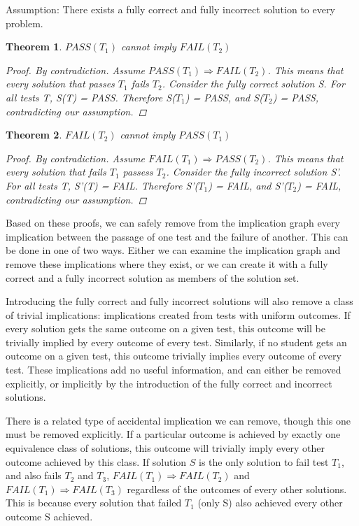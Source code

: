 \documentclass[11pt,twoside]{article}
\newcommand\fail{\mathit{FAIL}}
\newcommand\pass{\mathit{PASS}}
\newtheorem{thm}{Theorem}
\theoremstyle{definition}
\begin{document}
Assumption: There exists a fully correct and fully incorrect solution to every problem.


\begin{thm} $\pass(T_1)$ cannot imply $\fail(T_2)$

\begin{proof} By contradiction. Assume $\pass(T_1) \Rightarrow \fail(T_2)$. This means that every solution that passes $T_1$ fails $T_2$. Consider the fully correct solution S. For all tests T, S(T) = PASS. Therefore S($T_1$) = PASS, and S($T_2$) = PASS, contradicting our assumption.
\end{proof}
\end{thm}

\begin{thm} $\fail(T_2)$ cannot imply $\pass(T_1)$

\begin{proof} By contradiction. Assume $\fail(T_1) \Rightarrow \pass(T_2)$. This means that every solution that fails $T_1$ passess $T_2$. Consider the fully incorrect solution S'. For all tests T, S'(T) = FAIL. Therefore S'($T_1$) = FAIL, and S'($T_2$) = FAIL, contradicting our assumption.
\end{proof}
\end{thm}



Based on these proofs, we can safely remove from the implication graph every implication between the passage of one test and the failure of another. This can be done in one of two ways. Either we can examine the implication graph and remove these implications where they exist, or we can create it with a fully correct and a fully incorrect solution as members of the solution set.

Introducing the fully correct and fully incorrect solutions will also remove a class of trivial implications: implications created from tests with uniform outcomes. If every solution gets the same outcome on a given test, this outcome will be trivially implied by every outcome of every test. Similarly, if no student gets an outcome on a given test, this outcome trivially implies every outcome of every test. These implications add no useful information, and can either be removed explicitly, or implicitly by the introduction of the fully correct and incorrect solutions.

There is a related type of accidental implication we can remove, though this one must be removed explicitly. If a particular outcome is achieved by exactly one equivalence class of solutions, this outcome will trivially imply every other outcome achieved by this class. If solution $S$ is the only solution to fail test $T_1$, and also fails $T_2$ and $T_3$, $\fail(T_1) \Rightarrow \fail(T_2)$ and $\fail(T_1) \Rightarrow \fail(T_3)$ regardless of the outcomes of every other solutions. This is because every solution that failed $T_1$ (only S) also achieved every other outcome S achieved. 
\end{document}
